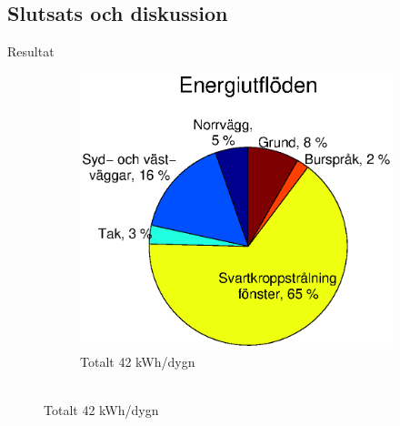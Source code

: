 \subsection{Slutsats och diskussion}

\begin{frame}{Resultat}


\begin{figure}
        \begin{subfigure}[b]{0.55\textwidth}
                \centering
                \includegraphics[width=\textwidth]{images/totalflow_out.eps}
                \caption*{Totalt 42 kWh/dygn \\ ~}
        \end{subfigure}
        \hskip-1.5cm
\end{figure}
\end{frame}
